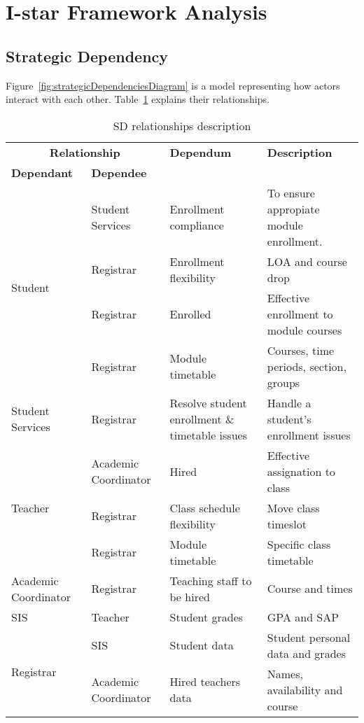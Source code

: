 \section{I-star Framework Analysis}
\label{sec:appendixIStarAnalysis}

\subsection{Strategic Dependency}
Figure~\ref{fig:strategicDependenciesDiagram} is a model representing how actors interact with each other.
Table~\ref{tab:strategicDependencies} explains their relationships.
\begin{table}
\centering
\caption{SD relationships description} \label{tab:strategicDependencies}
	\begin{tabularx}{\linewidth}{@{} p{0.8in} p{1.2in} p{1.6in} X @{}}
	\toprule
	\multicolumn{2}{c}{\textbf{Relationship}} & \textbf{Dependum} & \textbf{Description} \\
	\cmidrule(lr){1-2}
	\textbf{Dependant} & \textbf{Dependee} & & \\
	\midrule
	\multirow{4}{*}{Student} & Student Services & Enrollment compliance & To ensure appropiate module enrollment. \\
	& Registrar & Enrollment flexibility & LOA and course drop \\
	& Registrar & Enrolled & Effective enrollment to module courses \\
	& Registrar & Module timetable & Courses, time periods, section, groups \\
	\hline
	Student Services & Registrar & Resolve student enrollment \& timetable issues & Handle a student's enrollment issues\\
	\hline
	\multirow{3}{*}{Teacher} & Academic Coordinator & Hired & Effective assignation to class \\
	& Registrar & Class schedule flexibility & Move class timeslot \\
	& Registrar & Module timetable & Specific class timetable \\
	\hline
	Academic Coordinator & Registrar & Teaching staff to be hired & Course and times \\
	\hline
	SIS & Teacher & Student grades & GPA and SAP\\
	\hline
	\multirow{2}{*}{Registrar} & SIS & Student data & Student personal data and grades\\
	& Academic Coordinator & Hired teachers data & Names, availability and course\\
	\bottomrule
	\end{tabularx}
\end{table}

